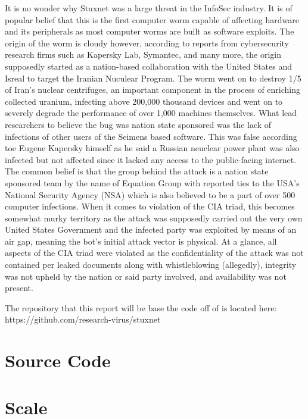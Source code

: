 \documentclass[12pt, letterpaper]{article}
\begin{document}
\begin{sloppypar}
\begin{flushleft}
It is no wonder why Stuxnet was a 
large threat in the InfoSec industry. It is of popular belief that this is
the first computer worm capable of affecting hardware and its peripherals as
most computer worms are built as software exploits. The origin of the worm is 
cloudy however, according to reports from cybersecurity research firms such 
as Kapersky Lab, Symantec, and many more, the origin supposedly started as 
a nation-based collaboration with the United States and Isreal to target the
Iranian Nuculear Program. The worm went on to destroy 1/5 of Iran's nuclear 
centrifuges, an important component in the process of enriching collected
uranium, infecting above 200,000 thousand devices and went on to severely 
degrade the performance of over 1,000 machines themselves. What lead 
researchers to believe the bug was nation state sponsored was the lack of
infections of other users of the Seimens based software. This was false 
according toe Eugene Kapersky himself as he said a Russian neuclear power
plant was also infected but not affected since it lacked any access to the
public-facing internet. The common belief is that the group behind the attack
is a nation state sponsored team by the name of Equation Group with reported
ties to the USA's National Security Agency (NSA) which is also believed to 
be a part of over 500 computer infections. When it comes to violation of the 
CIA triad, this becomes somewhat murky territory as the attack was supposedly
carried out the very own United States Government and the infected party was
exploited by means of an air gap, meaning the bot's initial attack vector
is physical. At a glance, all aspects of the CIA triad were violated as 
the confidentiality of the attack was not contained per leaked documents 
along with whistleblowing (allegedly), integrity was not upheld by the nation
or said party involved, and availability was not present. 


The repository that this report will be base the code off of is located 
here: https://github.com/research-virus/stuxnet




\section{Source Code}



\section*{Scale}



\end{flushleft}
\end{sloppypar}
\end{document}
